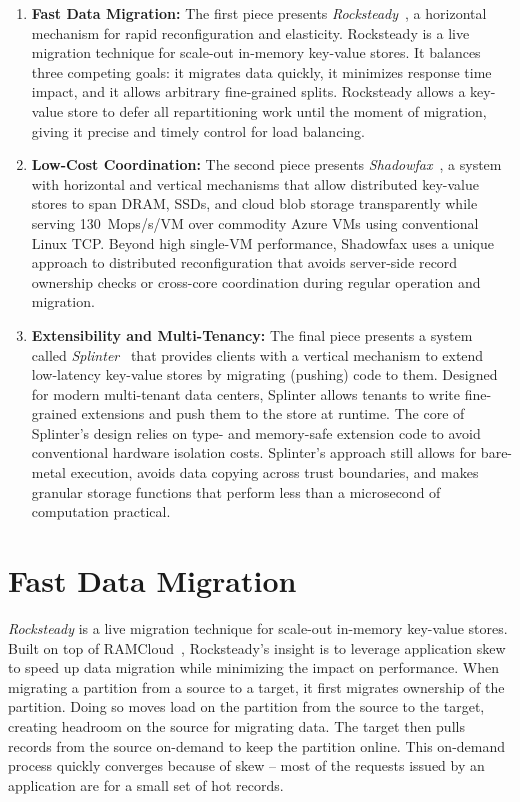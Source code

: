 \begin{enumerate}
\item \textbf{Fast Data Migration:}
The first piece presents \emph{Rocksteady}~\cite{rocksteady},
a horizontal mechanism for rapid reconfiguration and elasticity.
%
Rocksteady is a live migration technique for scale-out
in-memory key-value stores.
%
It balances three competing goals: it
migrates data quickly, it minimizes response time impact, and it
allows arbitrary fine-grained splits.
%
Rocksteady allows a key-value store to defer all repartitioning work
until the moment of migration, giving it precise and timely control for
load balancing.

\item \textbf{Low-Cost Coordination:}
The second piece presents \emph{Shadowfax}~\cite{shadowfax},
a system with horizontal and vertical mechanisms that
allow distributed key-value stores to
span DRAM, SSDs, and cloud blob storage transparently while serving
130~Mops/s/VM over commodity Azure VMs using conventional Linux TCP.
%
Beyond
high single-VM performance, Shadowfax uses a unique approach to distributed
reconfiguration that avoids server-side record ownership checks
or cross-core coordination during regular operation and migration.

\item \textbf{Extensibility and Multi-Tenancy:}
The final piece presents a system called \emph{Splinter}~\cite{splinter}
that
provides clients with a vertical mechanism
to extend low-latency key-value stores by migrating (pushing) code to them.
%
Designed for
modern multi-tenant data centers, Splinter allows
tenants to write
fine-grained extensions and push
them to the store at runtime.
%
The core of
Splinter's design relies on type- and memory-safe
extension code to avoid conventional hardware isolation costs.
%
Splinter's approach
still allows for bare-metal execution, avoids data copying across trust
boundaries, and makes granular storage functions that perform less than
a microsecond of computation practical.

\end{enumerate}

\section{Fast Data Migration}

\emph{Rocksteady} is a live migration technique for scale-out
in-memory key-value stores.
%
Built on top of RAMCloud~\cite{ramcloud}, Rocksteady’s insight is to
leverage application skew to speed up data migration while minimizing
the impact on performance.
%
When migrating a partition from a source to a target, it first migrates
ownership of the partition.
%
Doing so moves load on the partition from the source to the target, creating
headroom on the source for migrating data.
%
The target then pulls records from the source
on-demand to keep the partition online.
%
This on-demand process quickly converges because of skew –
most of the requests issued by an application are for a small set of hot
records.

